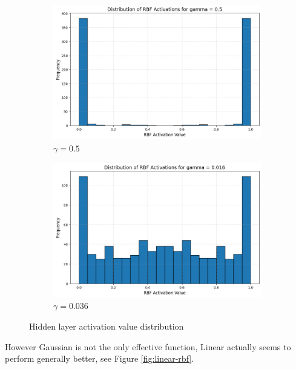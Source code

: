 \documentclass{article}
\begin{document}
\begin{enumerate}
\begin{figure}[H]
  \centering
  \centering
  \begin{subfigure}{0.45\linewidth}
      \centering
      \includegraphics[width=\linewidth]{img/NRBF_Activation_500.png}
      \caption{$\gamma=0.5$}
  \end{subfigure}
  \hfill %
  \begin{subfigure}{0.45\linewidth}
      \centering
      \includegraphics[width=\linewidth]{img/NRBF_Activation_16.png}
      \caption{$\gamma=0.036$}
      \label{fig:nrbf-dist-16}
  \end{subfigure}
  \caption{Hidden layer activation value distribution}
  \label{fig:nrbf-dist}
\end{figure}

However Gaussian is not the only effective function, Linear actually seems
to perform generally better, see Figure \ref{fig:linear-rbf}.


\end{enumerate}
\end{document}
